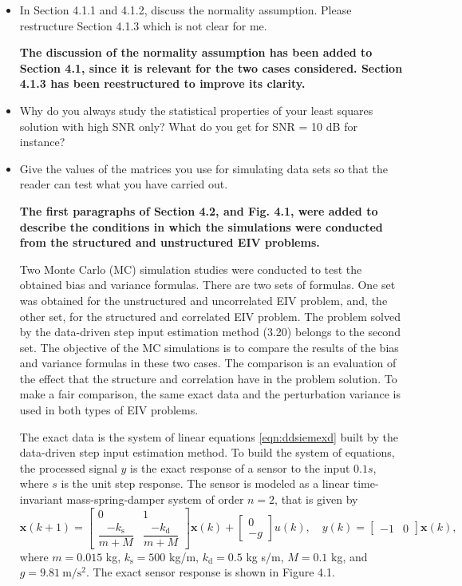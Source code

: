 \documentclass[11pt]{article}
\begin{document}
\begin{itemize}
    \item  In Section 4.1.1 and 4.1.2, discuss the normality assumption. Please restructure Section 4.1.3 which is not clear for me. 
    
    {\bfseries The discussion of the normality assumption has been added to Section 4.1, since it is relevant for the two cases considered. Section 4.1.3 has been reestructured to improve its clarity.}
    
    \item  Why do you always study the statistical properties of your least squares solution with high SNR only? What do you get for SNR = 10 dB for instance? 
    \item Give the values of the matrices you use for simulating data sets so that the reader can test what you have carried out. 
    
    {\bfseries The first paragraphs of Section 4.2, and Fig. 4.1, were added to describe the conditions in which the simulations were conducted from the structured and unstructured EIV problems.}

    \color{blue}
    Two Monte Carlo (MC) simulation studies were conducted to test the obtained bias and variance formulas.
    There are two sets of formulas.
    One set was obtained for the unstructured and uncorrelated EIV problem, and, the other set, for the structured and correlated EIV problem. 
    The problem solved by the data-driven step input estimation method (3.20) belongs to the second set.
    The objective of the MC simulations is to compare the results of the bias and variance formulas in these two cases. 
    The comparison is an evaluation of the effect that the structure and correlation have in the problem solution.
    To make a fair comparison, the same exact data and the perturbation variance is used in both types of EIV problems. 

    The exact data is the system of linear equations \ref{eqn:ddsiemexd} built by the data-driven step input estimation method.
    To build the system of equations, the processed signal ${y}$ is the exact response of a sensor to the input $0.1s$, where $s$ is the unit step response.  
    The sensor is modeled as a linear time-invariant mass-spring-damper system of order $n = 2$, that is given by 
    \begin{equation} \tag{4.37}
    \mathbf{x}(k+1) = \begin{bmatrix} 0 & 1 \\ \dfrac{-k_{\mathrm{s}}}{m+M} & \dfrac{-k_{\mathrm{d}}}{m+M} \end{bmatrix} \mathbf{x}(k) + \begin{bmatrix} 0\\ -g\end{bmatrix} u(k),  
    \quad y(k) = \begin{bmatrix} -1 & 0 \end{bmatrix} \mathbf{x}(k), \label{eqn:msdst}
    \end{equation}
    where $m=0.015$ kg, $k_{\mathrm{s}}=500$ kg/m, $k_{\mathrm{d}}=0.5$ kg s/m, $M=0.1$ kg, and $g=9.81 \ \mathrm{m/s^2}$.   
    The exact sensor response is shown in Figure 4.1.


\end{itemize}
\end{document}
